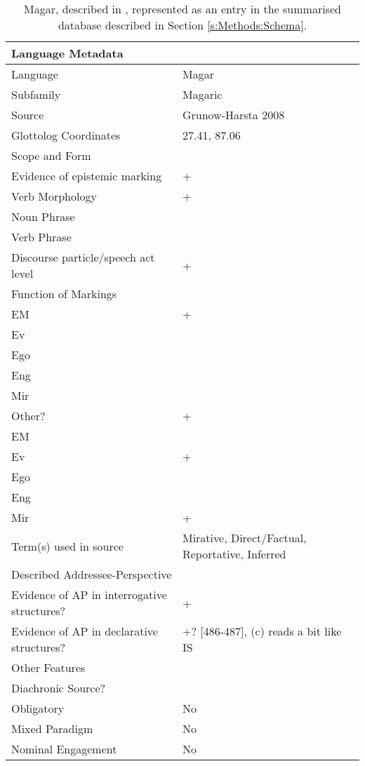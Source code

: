 \begin{table}
  \caption{Magar, described in , represented as an entry in the summarised database described in Section \ref{s:Methods:Schema}.}\label{t:Methods:SchemaExample}
  \begin{tabular}{|l|l|}
  \hline\hline
  \multicolumn{2}{|l|}{Language Metadata} \\ \hline
  Language & Magar \\ \hline
  Subfamily & Magaric \\ \hline
  Source & Grunow-Harsta 2008 \\ \hline
  Glottolog Coordinates & 27.41, 87.06 \\ \hline \hline
  \multicolumn{2}{|l|}{Scope and Form} \\ \hline
  Evidence of epistemic marking & + \\ \hline
  Verb Morphology & + \\ \hline
  Noun Phrase &  \\ \hline
  Verb Phrase &  \\ \hline
  Discourse particle/speech act level & + \\ \hline \hline
  \multicolumn{2}{|l|}{Function of Markings} \\ \hline
  EM & + \\ \hline
  Ev &  \\ \hline
  Ego &  \\ \hline
  Eng &  \\ \hline
  Mir &  \\ \hline
  Other? & + \\ \hline \hline
  EM &  \\ \hline
  Ev & + \\ \hline
  Ego &  \\ \hline
  Eng &  \\ \hline
  Mir & + \\ \hline \hline
  Term(s) used in source & Mirative, Direct/Factual, Reportative, Inferred \\ \hline \hline
  \multicolumn{2}{|l|}{Described Addressee-Perspective} \\ \hline
  Evidence of AP in interrogative structures? & + \\ \hline
  Evidence of AP in declarative structures? & +? {[}486-487{]}, (c) reads a bit like IS \\ \hline \hline
  \multicolumn{2}{|l|}{Other Features} \\ \hline
  Diachronic Source? &  \\ \hline
  Obligatory & No \\ \hline 
  Mixed Paradigm & No \\ \hline
  Nominal Engagement & No \\ \hline \hline
  \end{tabular}

  \end{table}


